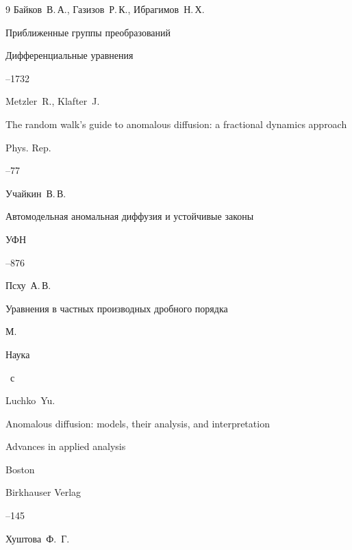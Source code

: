 \begin{thebibliography}{9}
\by Байков~В.\,А., Газизов~Р.\,К., Ибрагимов~Н.\,Х.

\paper Приближенные группы преобразований

\jour Дифференциальные уравнения



--1732




\by Metzler~R., Klafter~J.

\paper The random walk's guide to anomalous diffusion: a fractional dynamics approach

\jour Phys. Rep.



--77




\by Учайкин~В.\,В.

\paper Автомодельная аномальная диффузия и устойчивые законы

\jour УФН



--876

	


\by Псху~А.\,В.

\book Уравнения в частных производных дробного порядка

\publaddr М.

\publ Наука


~с




\by Luchko~Yu.

\paper Anomalous diffusion: models, their analysis, and interpretation

\inbook Advances in applied analysis

\publaddr Boston

\publ Birkhauser Verlag


--145




\by Хуштова~Ф.~Г.


\end{thebibliography}
